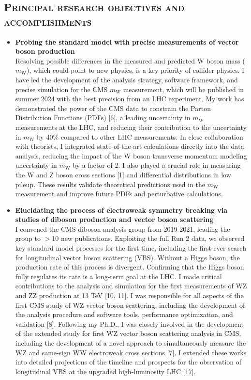 \documentclass[10pt]{res} %
\newcommand{\mw}{\ensuremath{m_{\mathrm{W}}}}
\begin{document}
\begin{resume}
\section{\textsc{Principal research objectives and accomplishments}}
\begin{itemize}
  \item\textbf{{Probing the standard model with precise measurements of vector boson production}} \\
    Resolving possible differences in the measured and predicted W boson mass (\mw), which could point to new physics, 
    is a key priority of collider physics.
    I have led the development of the analysis strategy, software framework, and precise simulation for the CMS $\mw$ measurement, 
    which will be published in summer 2024 with the best precision from an LHC experiment. My work has demonstrated the 
    power of the CMS data to constrain the Parton Distribution Functions (PDFs) [6], a leading uncertainty in $\mw$ measurements at the LHC,
    and reducing their contribution to the uncertainty in $\mw$ by 40\% compared to other LHC measurements. 
    In close collaboration with theorists, I integrated state-of-the-art calculations directly into the data analysis,
    reducing the impact of the W boson transverse momentum modeling uncertainty in $\mw$ by a factor of 2.
    I also played a crucial role in measuring the W and Z boson cross sections [1] and differential distributions in low pileup. 
    These results validate theoretical predictions used in the $\mw$ measurement and improve future PDFs and perturbative calculations.

  \item\textbf{Elucidating the process of electroweak symmetry breaking via studies of diboson production and vector boson scattering} \\
    I convened the CMS diboson analysis group from 2019-2021, leading the group to $>$10 new publications. 
    Exploiting the full Run 2 data, we observed key standard model processes for the first time, including the first-ever search 
    for longitudinal vector boson scattering (VBS). Without a Higgs boson, 
    the production rate of this process is divergent. Confirming that the Higgs boson fully regulates its rate is a long-term goal at the LHC.
    I made critical contributions to the analysis and simulation for the first measurements of WZ and ZZ production at 13 TeV [10, 11]. 
    I was responsible for all aspects of the first CMS study of WZ vector boson scattering, including the development of the analysis 
    procedure and software tools, performance optimization, and validation [8]. Following my Ph.D., I was closely involved in the 
    development of the extended study for first WZ vector boson scattering analysis in CMS, including the development of a novel 
    approach to simultaneously measure the WZ and same-sign WW electroweak cross sections [7]. I extended these works into detailed 
    projections of the timeline and prospects for the observation of longitudinal VBS at the upgraded high-luminosity LHC [17].


\end{itemize}
\end{resume}
\end{document}
